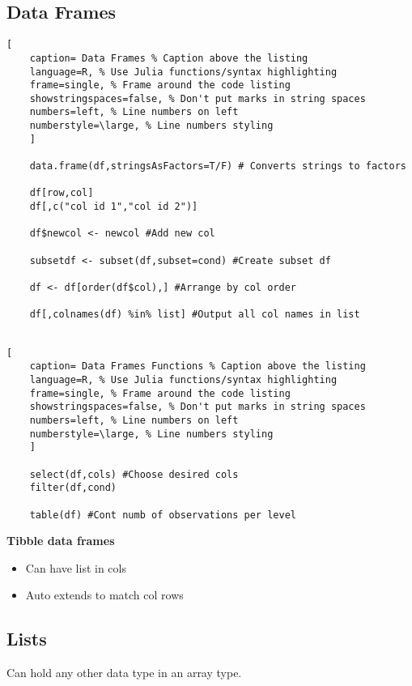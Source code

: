 \documentclass[11pt]{scrartcl} %
\begin{document}
\subsection{Data Frames}

\begin{lstlisting}[
	caption= Data Frames % Caption above the listing
	language=R, % Use Julia functions/syntax highlighting
	frame=single, % Frame around the code listing
	showstringspaces=false, % Don't put marks in string spaces
	numbers=left, % Line numbers on left
	numberstyle=\large, % Line numbers styling
	]

	data.frame(df,stringsAsFactors=T/F) # Converts strings to factors

	df[row,col]
	df[,c("col id 1","col id 2")]

	df$newcol <- newcol #Add new col

	subsetdf <- subset(df,subset=cond) #Create subset df

	df <- df[order(df$col),] #Arrange by col order

	df[,colnames(df) %in% list] #Output all col names in list
	
\end{lstlisting}


\begin{lstlisting}[
	caption= Data Frames Functions % Caption above the listing
	language=R, % Use Julia functions/syntax highlighting
	frame=single, % Frame around the code listing
	showstringspaces=false, % Don't put marks in string spaces
	numbers=left, % Line numbers on left
	numberstyle=\large, % Line numbers styling
	]

	select(df,cols) #Choose desired cols
	filter(df,cond)

	table(df) #Cont numb of observations per level

\end{lstlisting}

\textbf{Tibble data frames}

\begin{itemize}
	\item Can have list in cols
	\item Auto extends to match col rows 
\end{itemize}

\subsection{Lists}

Can hold any other data type in an array type.
\end{document}
